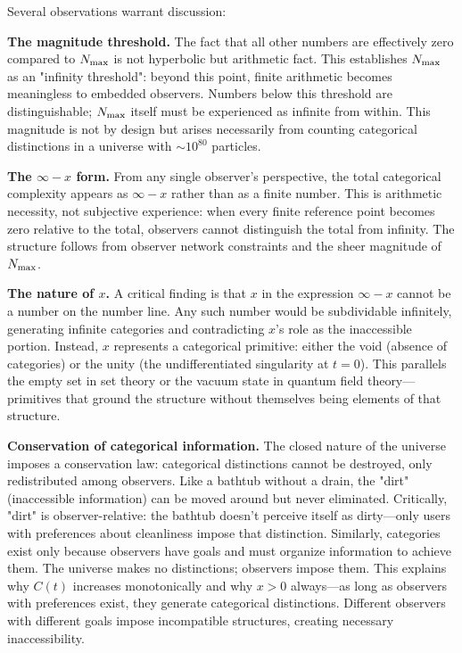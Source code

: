 Several observations warrant discussion:

\textbf{The magnitude threshold.} The fact that all other numbers are effectively zero compared to $N_{\text{max}}$ is not hyperbolic but arithmetic fact. This establishes $N_{\text{max}}$ as an "infinity threshold": beyond this point, finite arithmetic becomes meaningless to embedded observers. Numbers below this threshold are distinguishable; $N_{\text{max}}$ itself must be experienced as infinite from within. This magnitude is not by design but arises necessarily from counting categorical distinctions in a universe with $\sim 10^{80}$ particles.

\textbf{The $\infty - x$ form.} From any single observer's perspective, the total categorical complexity appears as $\infty - x$ rather than as a finite number. This is arithmetic necessity, not subjective experience: when every finite reference point becomes zero relative to the total, observers cannot distinguish the total from infinity. The structure follows from observer network constraints and the sheer magnitude of $N_{\text{max}}$.

\textbf{The nature of $x$.} A critical finding is that $x$ in the expression $\infty - x$ cannot be a number on the number line. Any such number would be subdividable infinitely, generating infinite categories and contradicting $x$'s role as the inaccessible portion. Instead, $x$ represents a categorical primitive: either the void (absence of categories) or the unity (the undifferentiated singularity at $t=0$). This parallels the empty set in set theory or the vacuum state in quantum field theory—primitives that ground the structure without themselves being elements of that structure.

\textbf{Conservation of categorical information.} The closed nature of the universe imposes a conservation law: categorical distinctions cannot be destroyed, only redistributed among observers. Like a bathtub without a drain, the "dirt" (inaccessible information) can be moved around but never eliminated. Critically, "dirt" is observer-relative: the bathtub doesn't perceive itself as dirty—only users with preferences about cleanliness impose that distinction. Similarly, categories exist only because observers have goals and must organize information to achieve them. The universe makes no distinctions; observers impose them. This explains why $C(t)$ increases monotonically and why $x > 0$ always—as long as observers with preferences exist, they generate categorical distinctions. Different observers with different goals impose incompatible structures, creating necessary inaccessibility.

